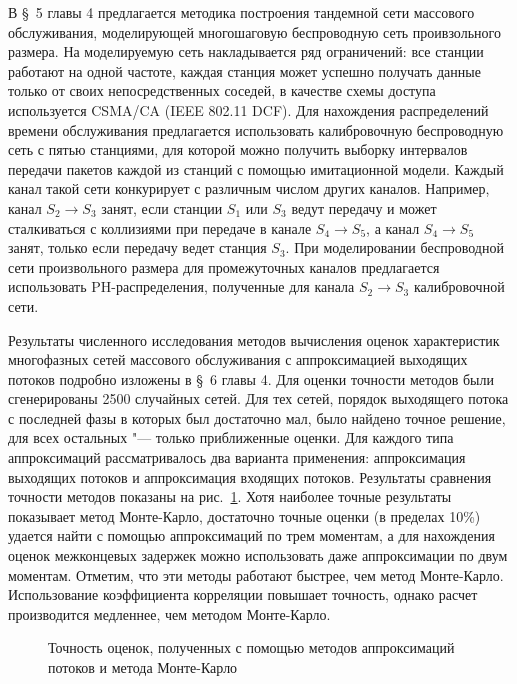В \S~5 главы 4 предлагается методика построения тандемной сети массового обслуживания, моделирующей многошаговую беспроводную сеть проивзольного размера. На моделируемую сеть накладывается ряд ограничений: все станции работают на одной частоте, каждая станция может успешно получать данные только от своих непосредственных соседей, в качестве схемы доступа используется CSMA/CA (IEEE 802.11 DCF). Для нахождения распределений времени обслуживания предлагается использовать калибровочную беспроводную сеть с пятью станциями, для которой можно получить выборку интервалов передачи пакетов каждой из станций с помощью имитационной модели. Каждый канал такой сети конкурирует с различным числом других каналов. Например, канал $S_2 \rightarrow S_3$ занят, если станции $S_1$ или $S_3$ ведут передачу и может сталкиваться с коллизиями при передаче в канале $S_4 \rightarrow S_5$, а канал $S_4 \rightarrow S_5$ занят, только если передачу ведет станция $S_3$. При моделировании беспроводной сети произвольного размера для промежуточных каналов предлагается использовать PH-распределения, полученные для канала $S_2 \rightarrow S_3$ калибровочной сети.

Результаты численного исследования методов вычисления оценок характеристик многофазных сетей массового обслуживания с аппроксимацией выходящих потоков подробно изложены в \S~6 главы 4. Для оценки точности методов были сгенерированы 2500 случайных сетей. Для тех сетей, порядок выходящего потока с последней фазы в которых был достаточно мал, было найдено точное решение, для всех остальных "--- только приближенные оценки. Для каждого типа аппроксимаций рассматривалось два варианта применения: аппроксимация выходящих потоков и аппроксимация входящих потоков. Результаты сравнения точности методов показаны на рис.~\ref{fig:approximations_summary}. Хотя наиболее точные результаты показывает метод Монте-Карло, достаточно точные оценки (в пределах 10\%) удается найти с помощью аппроксимаций по трем моментам, а для нахождения оценок межконцевых задержек можно использовать даже аппроксимации по двум моментам. Отметим, что эти методы работают быстрее, чем метод Монте-Карло. Использование коэффициента корреляции повышает точность, однако расчет производится медленнее, чем методом Монте-Карло.

\begin{figure}[ht!]
  \caption{Точность оценок, полученных с помощью методов аппроксимаций потоков и метода Монте-Карло}
  \label{fig:approximations_summary}
\end{figure}

